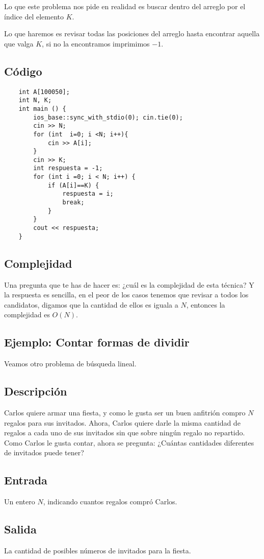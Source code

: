 Lo que este problema nos pide en realidad es buscar dentro del arreglo por el índice del elemento \(K\).

Lo que haremos es revisar todas las posiciones del arreglo hasta encontrar aquella que valga \(K\), si no la encontramos imprimimos \(-1\).


\subsection*{Código}
\begin{lstlisting}
	int A[100050];
	int N, K;
	int main () {	
		ios_base::sync_with_stdio(0); cin.tie(0);
		cin >> N;
		for (int  i=0; i <N; i++){ 
			cin >> A[i];
		}
		cin >> K;
		int respuesta = -1;
		for (int i =0; i < N; i++) {
			if (A[i]==K) {
				respuesta = i;
				break;
			}
		}
		cout << respuesta;
	}
\end{lstlisting}


\subsection{Complejidad}

Una pregunta que te has de hacer es: ¿cuál es la complejidad de esta técnica? Y la respuesta es sencilla, en el peor de los casos tenemos que revisar a todos los candidatos, digamos que la cantidad de ellos es iguala a \(N\), entonces la complejidad es \(O(N)\).

\subsection{Ejemplo: Contar formas de dividir}
Veamos otro problema de búsqueda lineal. 

\subsection*{Descripción}

Carlos quiere armar una fiesta, y como le gusta ser un buen anfitrión compro \(N\) regalos para sus invitados.
Ahora, Carlos quiere darle la misma cantidad de regalos a cada uno de sus invitados sin que sobre ningún regalo no repartido. Como Carlos le gusta contar, ahora se pregunta: ¿Cuántas cantidades diferentes de invitados puede tener?
\subsection*{Entrada}
Un entero \(N\), indicando cuantos regalos compró Carlos.
\subsection*{Salida}
La cantidad de posibles números de invitados para la fiesta.
